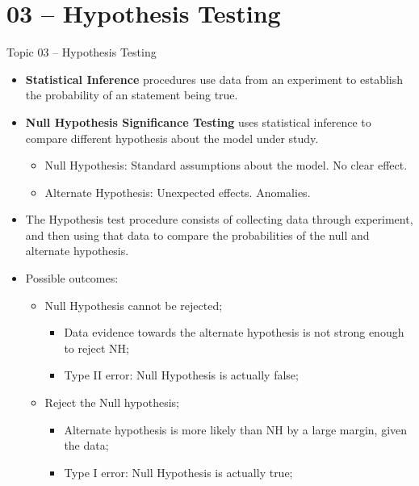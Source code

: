 \section{03 -- Hypothesis Testing}

\begin{frame}[t]{Topic 03 -- Hypothesis Testing}
  \begin{itemize}
    \item {\bf Statistical Inference} procedures use data from an experiment to establish the probability of an statement being true.\vfill
    \item {\bf Null Hypothesis Significance Testing} uses statistical inference to compare different hypothesis about the model under study.
    \begin{itemize}
      \item Null Hypothesis: Standard assumptions about the model. No clear effect.
      \item Alternate Hypothesis: Unexpected effects. Anomalies.
    \end{itemize}\vfill
    \item The Hypothesis test procedure consists of collecting data through experiment, and then using that data to compare the probabilities of the null and alternate hypothesis.\vfill
    \item Possible outcomes:
    \begin{itemize}
      \item Null Hypothesis cannot be rejected;
      \begin{itemize}
        \item Data evidence towards the alternate hypothesis is not strong enough to reject NH;
        \item Type II error: Null Hypothesis is actually false;
      \end{itemize}
      \item Reject the Null hypothesis;
      \begin{itemize}
        \item Alternate hypothesis is more likely than NH by a large margin, given the data;
        \item Type I error: Null Hypothesis is actually true;
      \end{itemize}
    \end{itemize}
  \end{itemize}
\end{frame}

